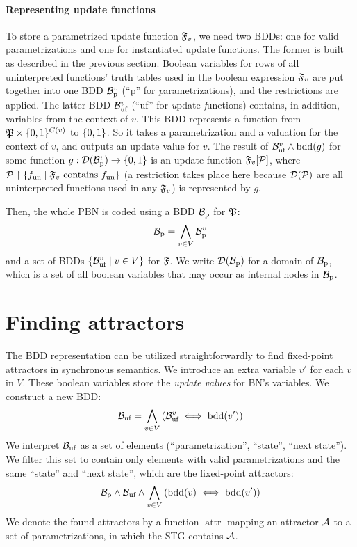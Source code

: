 \documentclass[
	digital, oneside, nosansbold, nocolorbold, nolot, nolof
]{fithesis4}
\theoremstyle{definition}
\theoremstyle{definition}
\DeclareMathOperator{\bdd}{bdd}
\DeclareMathOperator{\attrf}{attr}
\DeclarePairedDelimiter{\set}{\{}{\}}
\begin{document}
\paragraph{Representing update functions}
To store a parametrized update function $\mathfrak{F}_v$, we need two BDDs: one
for valid parametrizations and one for instantiated update functions. The
former is built as described in the previous section. Boolean variables for
rows of all uninterpreted functions' truth tables used in the boolean
expression $\mathfrak{F}_v$ are put together into one BDD $\mathcal{B}_{\text{p}}^v$
(\enquote{p} for \emph{p}arametrizations), and the restrictions are applied.
The latter BDD $\mathcal{B}_{\text{uf}}^v$ (\enquote{uf} for \emph{u}pdate \emph{f}unctions)
contains, in addition, variables from the context of $v$. This BDD represents a
function from $\paronset{P} \times \set{0, 1}^{C(v)}$ to $\set{0, 1}$. So it
takes a parametrization and a valuation for the context of $v$, and outputs an
update value for $v$.  The result of $\bdduf{B}^v \land \bdd(g)$ for some
function $g : \dom{\bddp{B}^v} \to \set{0, 1}$ is an update function
$\mathfrak{F}_v[\mathcal{P}]$, where $\paron{P} \restriction \set{\unf{f} \mid
\PBNUFs{F}_v \text{ contains } \unf{f}}$ (a restriction takes place here
because $\mathcal{D}(\mathcal{P})$ are all uninterpreted functions used in any
$\mathfrak{F}_v$) is represented by $g$.

Then, the whole PBN is coded using a BDD $\mathcal{B}_{\text{p}}$ for $\mathfrak{P}$:
\[
    \mathcal{B}_{\text{p}} = \bigwedge_{v \in V} \mathcal{B}_{\text{p}}^v
\]
and a set of BDDs $\set{\bdduf{B}^v \mid v \in V}$ for $\mathfrak{F}$. We write
$\mathcal{D}(\mathcal{B}_{\text{p}})$ for a domain of $\mathcal{B}_{\text{p}}$, which is a set of all boolean
variables that may occur as internal nodes in $\mathcal{B}_{\text{p}}$.

\section{Finding attractors}

The BDD representation can be utilized straightforwardly to find fixed-point
attractors in synchronous semantics. We introduce an extra variable $v'$ for
each $v$ in $V$. These boolean variables store the \emph{update values} for
BN's variables. We construct a new BDD:
\[
    \bdduf{B} = \bigwedge_{v \in V} \left( \bdduf{B}^v \iff \bdd(v') \right)
\]
We interpret $\mathcal{B}_{\text{uf}}$ as a set of elements (\enquote{parametrization},
\enquote{state}, \enquote{next state}). We filter this set to contain only
elements with valid parametrizations and the same \enquote{state} and
\enquote{next state}, which are the fixed-point attractors:
\[
    \bddp{B} \land \bdduf{B} \land
    \bigwedge_{v \in V} \left( \bdd(v) \iff \bdd(v') \right)
\]
We denote the found attractors by a function $\attrf$ mapping an
attractor $\mathcal{A}$ to a set of parametrizations, in which the STG contains
$\mathcal{A}$.
\end{document}
